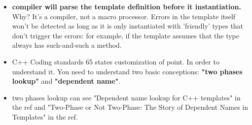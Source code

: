\documentclass[a4paper,11pt,twoside]{book}
\begin{document}
\begin{itemize}
\item \textbf{compiler will parse the template definition before it instantiation.} Why? It's a compiler, not a macro processor. Errors in the template itself won't be detected as long as it is only instantiated with 'friendly' types that don't trigger the errors: for example, if the template assumes that the type always has such-and-such a method.

\item C++ Coding standards 65 states customization of point. In order to understand it. You need to understand two basic conceptions: \textbf{"two phases lookup"} and \textbf{"dependent name"}.  

\item two phases lookup can see "Dependent name lookup for C++ templates" in the ref and "Two-Phase or Not Two-Phase: The Story of Dependent Names in Templates" in the ref.
\end{itemize}
\end{document}
